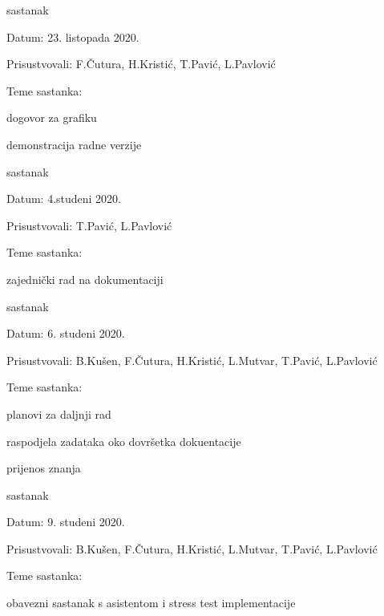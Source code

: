 \begin{packed_enum}
			\item  sastanak
	\item[] \begin{packed_item}
		\item Datum: 23. listopada 2020.
		\item Prisustvovali: F.Čutura, H.Kristić, T.Pavić, L.Pavlović
		\item Teme sastanka:
		\begin{packed_item}
			\item  dogovor za grafiku
			\item demonstracija radne verzije
		\end{packed_item}
	\end{packed_item}
	
	
		\item  sastanak
		\item[] \begin{packed_item}
			\item Datum: 4.studeni 2020.
			\item Prisustvovali: T.Pavić, L.Pavlović
			\item Teme sastanka:
			\begin{packed_item}
				\item  zajednički rad na dokumentaciji
			\end{packed_item}
		\end{packed_item}
	
							\item  sastanak
	\item[] \begin{packed_item}
		\item Datum: 6. studeni 2020.
		\item Prisustvovali: B.Kušen, F.Čutura, H.Kristić, L.Mutvar, T.Pavić, L.Pavlović
		\item Teme sastanka:
		\begin{packed_item}
			\item  planovi za daljnji rad
			\item raspodjela zadataka oko dovršetka dokuentacije 
			\item prijenos znanja
		\end{packed_item}
	\end{packed_item}


		\item  sastanak
			\item[] \begin{packed_item}
				\item Datum: 9. studeni 2020.
				\item Prisustvovali: B.Kušen, F.Čutura, H.Kristić, L.Mutvar, T.Pavić, L.Pavlović
				\item Teme sastanka:
				\begin{packed_item}
					\item  obavezni sastanak s asistentom i stress test implementacije
				\end{packed_item}
			\end{packed_item}


\end{packed_enum}

